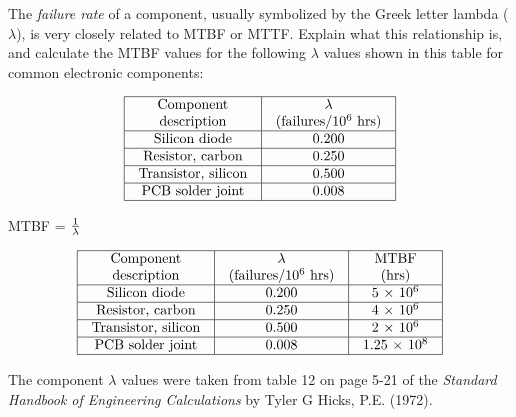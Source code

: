 

The {\it failure rate} of a component, usually symbolized by the Greek letter lambda ($\lambda$), is very closely related to MTBF or MTTF.  Explain what this relationship is, and calculate the MTBF values for the following $\lambda$ values shown in this table for common electronic components:


$$\vbox{\offinterlineskip
\halign{\strut
\vrule \quad\hfil # \ \hfil & 
\vrule \quad\hfil # \ \hfil \vrule \cr
\noalign{\hrule}
%
Component & $\lambda$ \cr
%
description & (failures/$10^6$ hrs) \cr
%
\noalign{\hrule}
%
Silicon diode & 0.200 \cr
%
\noalign{\hrule}
%
Resistor, carbon & 0.250 \cr
%
\noalign{\hrule}
%
Transistor, silicon & 0.500 \cr
%
\noalign{\hrule}
%
PCB solder joint & 0.008 \cr
%
\noalign{\hrule}
} %
}$$ %







MTBF = ${1 \over \lambda}$


$$\vbox{\offinterlineskip
\halign{\strut
\vrule \quad\hfil # \ \hfil & 
\vrule \quad\hfil # \ \hfil & 
\vrule \quad\hfil # \ \hfil \vrule \cr
\noalign{\hrule}
%
Component & $\lambda$ & MTBF \cr
%
description & (failures/$10^6$ hrs) & (hrs) \cr
%
\noalign{\hrule}
%
Silicon diode & 0.200 & 5 $\times$ $10^6$ \cr
%
\noalign{\hrule}
%
Resistor, carbon & 0.250 & 4 $\times$ $10^6$ \cr
%
\noalign{\hrule}
%
Transistor, silicon & 0.500 & 2 $\times$ $10^6$ \cr
%
\noalign{\hrule}
%
PCB solder joint & 0.008 & 1.25 $\times$ $10^8$ \cr
%
\noalign{\hrule}
} %
}$$ %







The component $\lambda$ values were taken from table 12 on page 5-21 of the {\it Standard Handbook of Engineering Calculations} by Tyler G Hicks, P.E. (1972).




